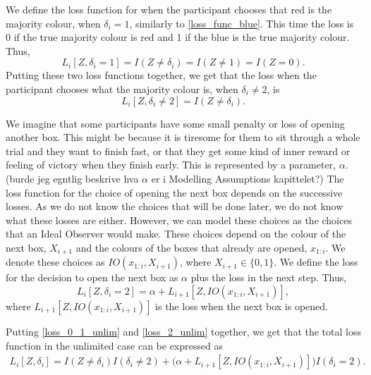 We define the loss function for when the participant chooses that red is the majority colour, when $\delta_i=1$, similarly to \eqref{loss_func_blue}. This time the loss is 0 if the true majority colour is red and 1 if the blue is the true majority colour. Thus,
\begin{equation}
\label{loss_func_red}
    L_i[Z,\delta_i=1] = I(Z\neq\delta_i) = I(Z\neq1)=I(Z=0).
\end{equation}
Putting these two loss functions together, we get that the loss when the participant chooses what the majority colour is, when $\delta_i \neq 2$, is 
\begin{equation}
\label{loss_0_1_unlim}
    L_i[Z,\delta_i \neq 2] = I(Z \neq \delta_i). 
\end{equation}

We imagine that some participants have some small penalty or loss of opening another box. This might be because it is tiresome for them to sit through a whole trial and they want to finish fast, or that they get some kind of inner reward or feeling of victory when they finish early. This is represented by a parameter, $\alpha$. (burde jeg egntlig beskrive hva $\alpha$ er i Modelling Assumptions kapittelet?)
The loss function for the choice of opening the next box depends on the successive losses. As we do not know the choices that will be done later, we do not know what these losses are either. However, we can model these choices as the choices that an Ideal Observer would make. These choices depend on the colour of the next box, $X_{i+1}$ and the colours of the boxes that already are opened, $x_{1:i}$. We denote these choices as $IO(x_{1:i},X_{i+1})$, where $X_{i+1} \in \{0,1\}$.
We define the loss for the decision to open the next box as $\alpha$ plus the loss in the next step. Thus, 
\begin{equation}
\label{loss_2_unlim}
    L_i[Z,\delta_i=2] = \alpha + L_{i+1}[Z,IO(x_{1:i},X_{i+1})],
\end{equation}
where $L_{i+1}[Z,IO(x_{1:i},X_{i+1})]$ is the loss when the next box is opened. 


Putting \eqref{loss_0_1_unlim} and \eqref{loss_2_unlim} together, we get that the total loss function in the unlimited case can be expressed as
\begin{equation*}
    \begin{aligned}
       L_i[Z,\delta_{i}] 
       = I(Z \neq \delta_i)I(\delta_i\neq2)
       + \big(\alpha + L_{i+1}[Z,IO(x_{1:i},X_{i+1})] \big) I(\delta_i=2).
    \end{aligned}
\end{equation*}

